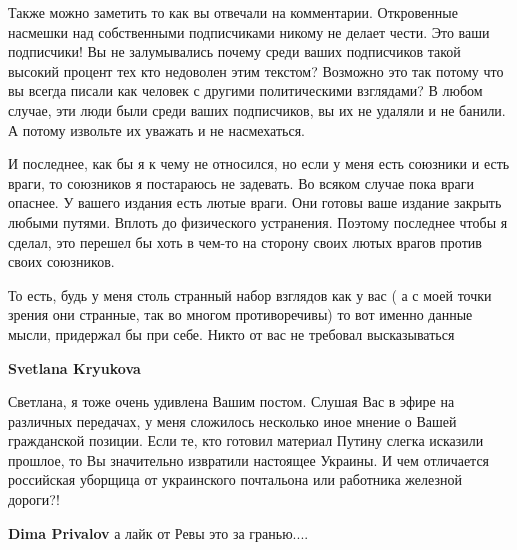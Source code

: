 \begin{itemize}
\begin{itemize}
Также можно заметить то как вы отвечали на комментарии. Откровенные насмешки
над собственными подписчиками никому не делает чести. Это ваши подписчики! Вы
не залумывались почему среди ваших подписчиков такой высокий процент тех кто
недоволен этим текстом? Возможно это так потому что вы всегда писали как
человек с другими политическими взглядами? В любом случае, эти люди были среди
ваших подписчиков, вы их не удаляли и не банили. А потому извольте их уважать и
не насмехаться.

И последнее, как бы я к чему не относился, но если у меня есть союзники и есть
враги, то союзников я постараюсь не задевать. Во всяком случае пока враги
опаснее. У вашего издания есть лютые враги. Они готовы ваше издание закрыть
любыми путями. Вплоть до физического устранения. Поэтому последнее чтобы я
сделал, это перешел бы хоть в чем-то на сторону своих лютых врагов против своих
союзников.

То есть, будь у меня столь странный набор взглядов как у вас ( а с моей точки
зрения они странные, так во многом противоречивы) то вот именно данные мысли,
придержал бы при себе. Никто от вас не требовал высказываться

 
\textbf{Svetlana Kryukova}

Светлана, я тоже очень удивлена Вашим постом. Слушая Вас в эфире на различных
передачах, у меня сложилось несколько иное мнение о Вашей гражданской позиции.
Если те, кто готовил материал Путину слегка исказили прошлое, то Вы значительно
извратили настоящее Украины. И чем отличается российская уборщица от
украинского почтальона или работника железной дороги?!


 
\textbf{Dima Privalov} а лайк от Ревы это за гранью....

 

\end{itemize}
\end{itemize}
